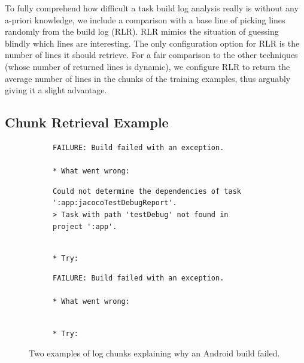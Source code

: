 To fully comprehend how difficult a task build log analysis really
is without any a-priori knowledge, we include a comparison with a
base line of
picking lines randomly from the build log (RLR).
RLR mimics the
situation of guessing blindly which lines are interesting.
The only configuration option for RLR is the number of lines it should
retrieve.
For a fair comparison to the other techniques (whose number of
returned lines is dynamic), we configure RLR to return the average
number of lines in the chunks of the training examples, thus arguably
giving it a slight advantage.


\subsection{Chunk Retrieval Example}
\label{sec:crt-example}

\begin{figure}[tbp]
  \centering
\begin{subfigure}[tbp]{\columnwidth}
  \begin{lstlisting}[breaklines=true,frame=tlr]
FAILURE: Build failed with an exception.

* What went wrong:
  \end{lstlisting}
  \vspace{-\baselineskip}
  \begin{lstlisting}[backgroundcolor=\color{Cerulean!60},breaklines=true,frame=rl]
Could not determine the dependencies of task ':app:jacocoTestDebugReport'.
> Task with path 'testDebug' not found in project ':app'.
  \end{lstlisting}
  \vspace{-\baselineskip}
  \begin{lstlisting}[breaklines=true,frame=blr]

* Try:
  \end{lstlisting}
\end{subfigure}\hspace{\fill}
\begin{subfigure}[tbp]{\columnwidth}
  \centering
  \begin{lstlisting}[breaklines=true,frame=tlr]
FAILURE: Build failed with an exception.

* What went wrong:
  \end{lstlisting}
  \vspace{-\baselineskip}
  
  \vspace{-\baselineskip}
  \begin{lstlisting}[breaklines=true,frame=blr]

* Try:
  \end{lstlisting}
\end{subfigure}
  \caption{Two examples of log chunks explaining why an Android
  build failed.}
  \label{lst:chunk-example}
\end{figure}

